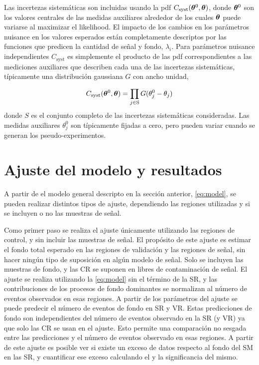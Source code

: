 Las incertezas sistemáticas son incluidas usando la pdf
$C_\text{syst}(\bm{\theta}^0, \bm{\theta})$, donde $\bm{\theta}^0$ son los valores centrales
de las medidas auxiliares alrededor de los cuales $\bm{\theta}$ puede variarse al
maximizar el likelihood. El impacto de los cambios en los parámetros nuisance
en los valores esperados están completamente descriptos por las funciones que
predicen la cantidad de señal y fondo, $\lambda_i$. Para parámetros nuisance
independientes $C_\text{syst}$ es simplemente el producto de las pdf
correspondientes a las mediciones auxiliares que describen cada una de las
incertezas sistemáticas, típicamente una distribución gaussiana $G$ con ancho
unidad,

\begin{equation}
  C_\text{syst} (\bm{\theta}^0, \bm{\theta}) = \prod_{j \in \text{S}} G(\theta_j^0 -
  \theta_j)
\end{equation}
%
donde $S$ es el conjunto completo de las incertezas sistemáticas consideradas. Las
medidas auxiliares $\theta^0_j$ son típicamente fijadas a cero, pero pueden
variar cuando se generan los pseudo-experimentos.


\section{Ajuste del modelo y resultados}

A partir de el modelo general descripto en la sección anterior, \cref{eq:model},
se pueden realizar distintos tipos de ajuste, dependiendo las regiones utilizadas
y si se incluyen o no las muestras de señal.

Como primer paso se realiza el ajuste únicamente utilizando las regiones de
control, y sin incluir las muestras de señal. El propósito de este ajuste es
estimar el fondo total esperado en las regiones de validación y las regiones de
señal, sin hacer ningún tipo de suposición en algún modelo de señal. Solo se
incluyen las muestras de fondo, y las CR se suponen en libres de contaminación
de señal. El ajuste se realiza utilizando la \cref{eq:model} sin el término de
la SR, y las contribuciones de los procesos de fondo dominantes se normalizan al
número de eventos observados en esas regiones. A partir de los parámetros del
ajuste se puede predecir el número de eventos de fondo en SR y VR. Estas
predicciones de fondo son independientes del número de eventos observado en la
SR (y VR) ya que solo las CR se usan en el ajuste. Esto permite una comparación
no sesgada entre las predicciones y el número de eventos observado en esas
regiones.
A partir de este ajuste es posible ver si existe un exceso de datos respecto al
fondo del SM en las SR, y cuantificar ese exceso calculando el {\pvalue} y la significancia
del mismo.

